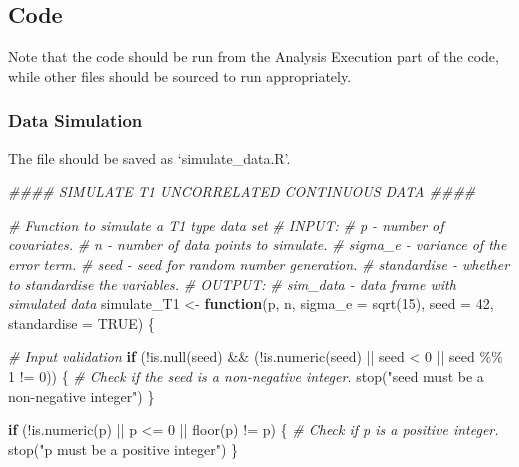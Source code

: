 \documentclass[
  11pt,
]{article}
\newenvironment{Shaded}{}{}
\newcommand{\AttributeTok}[1]{\textcolor[rgb]{0.49,0.56,0.16}{#1}}
\newcommand{\CommentTok}[1]{\textcolor[rgb]{0.38,0.63,0.69}{\textit{#1}}}
\newcommand{\ConstantTok}[1]{\textcolor[rgb]{0.53,0.00,0.00}{#1}}
\newcommand{\ControlFlowTok}[1]{\textcolor[rgb]{0.00,0.44,0.13}{\textbf{#1}}}
\newcommand{\DecValTok}[1]{\textcolor[rgb]{0.25,0.63,0.44}{#1}}
\newcommand{\DocumentationTok}[1]{\textcolor[rgb]{0.73,0.13,0.13}{\textit{#1}}}
\newcommand{\FunctionTok}[1]{\textcolor[rgb]{0.02,0.16,0.49}{#1}}
\newcommand{\NormalTok}[1]{#1}
\newcommand{\OtherTok}[1]{\textcolor[rgb]{0.00,0.44,0.13}{#1}}
\newcommand{\SpecialCharTok}[1]{\textcolor[rgb]{0.25,0.44,0.63}{#1}}
\newcommand{\StringTok}[1]{\textcolor[rgb]{0.25,0.44,0.63}{#1}}
\begin{document}
\subsection{Code}

Note that the code should be run from the Analysis Execution part of the
code, while other files should be sourced to run appropriately.

\subsubsection{Data Simulation}

The file should be saved as `simulate\_data.R'.

\begin{Shaded}
\begin{Highlighting}[]
\DocumentationTok{\#\#\#\# SIMULATE T1 UNCORRELATED CONTINUOUS DATA \#\#\#\#}

\CommentTok{\# Function to simulate a T1 type data set}
\CommentTok{\# INPUT: }
\CommentTok{\#       p {-} number of covariates.}
\CommentTok{\#       n {-} number of data points to simulate.}
\CommentTok{\#       sigma\_e {-} variance of the error term.}
\CommentTok{\#       seed {-} seed for random number generation.}
\CommentTok{\#       standardise {-} whether to standardise the variables.}
\CommentTok{\# OUTPUT:}
\CommentTok{\#       sim\_data {-} data frame with simulated data}
\NormalTok{simulate\_T1 }\OtherTok{\textless{}{-}} \ControlFlowTok{function}\NormalTok{(p, n, }\AttributeTok{sigma\_e =} \FunctionTok{sqrt}\NormalTok{(}\DecValTok{15}\NormalTok{), }
                        \AttributeTok{seed =} \DecValTok{42}\NormalTok{, }\AttributeTok{standardise =} \ConstantTok{TRUE}\NormalTok{) \{}
  
  \CommentTok{\# Input validation}
  \ControlFlowTok{if}\NormalTok{ (}\SpecialCharTok{!}\FunctionTok{is.null}\NormalTok{(seed) }\SpecialCharTok{\&\&}\NormalTok{ (}\SpecialCharTok{!}\FunctionTok{is.numeric}\NormalTok{(seed) }\SpecialCharTok{||}\NormalTok{ seed }\SpecialCharTok{\textless{}} \DecValTok{0} \SpecialCharTok{||}\NormalTok{ seed }\SpecialCharTok{\%\%} \DecValTok{1} \SpecialCharTok{!=} \DecValTok{0}\NormalTok{)) \{}
    \CommentTok{\# Check if the seed is a non{-}negative integer.}
    \FunctionTok{stop}\NormalTok{(}\StringTok{"seed must be a non{-}negative integer"}\NormalTok{)}
\NormalTok{  \}}
  
  \ControlFlowTok{if}\NormalTok{ (}\SpecialCharTok{!}\FunctionTok{is.numeric}\NormalTok{(p) }\SpecialCharTok{||}\NormalTok{ p }\SpecialCharTok{\textless{}=} \DecValTok{0} \SpecialCharTok{||} \FunctionTok{floor}\NormalTok{(p) }\SpecialCharTok{!=}\NormalTok{ p) \{}
    \CommentTok{\# Check if p is a positive integer.}
    \FunctionTok{stop}\NormalTok{(}\StringTok{"p must be a positive integer"}\NormalTok{)}
\NormalTok{  \}}
  

\end{Highlighting}
\end{Shaded}
\end{document}
